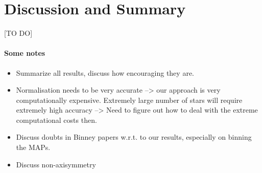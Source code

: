 \section{Discussion and Summary}

[TO DO]

\paragraph{Some notes}
\begin{itemize}
\item Summarize all results, discuss how encouraging they are.
\item Normalisation needs to be very accurate --> our approach is very computationally expensive. Extremely large number of stars will require extremely high accuracy --> Need to figure out how to deal with the extreme computational costs then.
\item Discuss doubts in Binney papers w.r.t. to our results, especially on binning the MAPs.
\item Discuss non-axisymmetry
\end{itemize}
